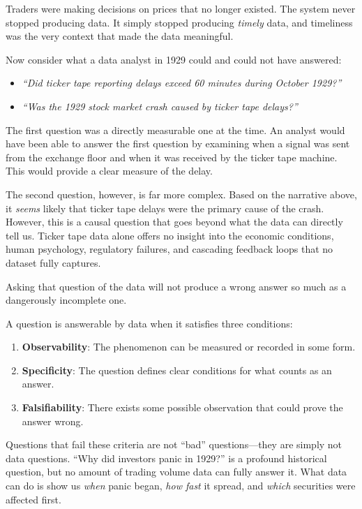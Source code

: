 Traders were making decisions on prices that no longer existed. The system 
never stopped producing data. It simply stopped producing 
\textit{timely} data, and timeliness was the very context that made 
the data meaningful.

Now consider what a data analyst in 1929 could and could not have answered:

\begin{itemize}
    \item \textit{``Did ticker tape reporting delays exceed 60 minutes 
    during October 1929?''} 
    \item \textit{``Was the 1929 stock market crash caused by ticker tape 
    delays?''}
\end{itemize}

The first question was a directly measurable one at the time. 
An analyst would have been able to answer the first question by examining when a signal was sent from the exchange floor and when it was received by the ticker tape machine. 
This would provide a clear measure of the delay.

The second question, however, is far more complex. Based on the narrative above, it \textit{seems} likely that ticker tape delays were the primary cause of the crash. 
However, this is a causal question that goes beyond what the data can directly tell us. 
Ticker tape data alone offers no insight into the economic conditions, 
human psychology, regulatory failures, and cascading feedback loops that 
no dataset fully captures.

Asking that question of the data will not produce a wrong answer so much as a dangerously incomplete one.

A question is answerable by data when it satisfies three conditions:

\begin{enumerate}
    \item \textbf{Observability}: The phenomenon can be measured or 
    recorded in some form.
    \item \textbf{Specificity}: The question defines clear conditions 
    for what counts as an answer.
    \item \textbf{Falsifiability}: There exists some possible observation 
    that could prove the answer wrong.
\end{enumerate}

Questions that fail these criteria are not ``bad'' questions---they are simply not data questions. ``Why did investors panic in 1929?'' is a profound historical question, but no amount of trading volume data can fully answer it. What data can do is show us \textit{when} panic began, \textit{how fast} it spread, and \textit{which} securities were affected first.

